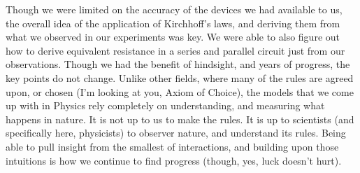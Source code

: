 \documentclass[%
 aip,
 jmp,
 amsmath,
 amssymb,
 reprint,%
 numerical,
 longbibliography,
]{revtex4-1}
\begin{document}
Though we were limited on the accuracy of the devices we had available to us, the overall
idea of the application of Kirchhoff's laws, and deriving them from what we observed in
our experiments was key. We were able to also figure out how to derive equivalent resistance
in a series and parallel circuit just from our observations. Though we had the benefit of
hindsight, and years of progress, the key points do not change. Unlike other fields, where
many of the rules are agreed upon, or chosen (I'm looking at you, Axiom of Choice), the
models that we come up with in Physics rely completely on understanding, and measuring 
what happens in nature. It is not up to us to make the rules. It is up to scientists
(and specifically here, physicists) to observer nature, and understand its rules. Being
able to pull insight from the smallest of interactions, and building upon those intuitions
is how we continue to find progress (though, yes, luck doesn't hurt).
\end{document}
